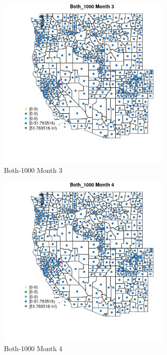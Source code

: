 \begin{figure} 
\centering  
\includegraphics[width=0.77\textwidth]{Code_Outputs/df_report_ML_predictors_CountyCentroid_Locations_Dates_2008-01-01to2018-12-31_MapObsMo3Both_1000.jpg} 
\caption{\label{fig:df_report_ML_predictors_CountyCentroid_Locations_Dates_2008-01-01to2018-12-31MapObsMo3Both_1000}Both-1000 Month 3} 
\end{figure} 
 

\begin{figure} 
\centering  
\includegraphics[width=0.77\textwidth]{Code_Outputs/df_report_ML_predictors_CountyCentroid_Locations_Dates_2008-01-01to2018-12-31_MapObsMo4Both_1000.jpg} 
\caption{\label{fig:df_report_ML_predictors_CountyCentroid_Locations_Dates_2008-01-01to2018-12-31MapObsMo4Both_1000}Both-1000 Month 4} 
\end{figure} 
 


